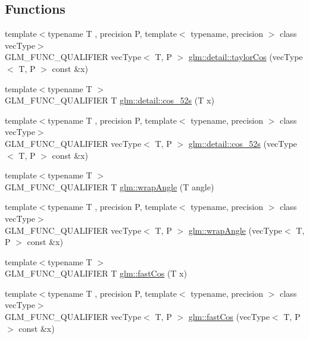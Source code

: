 \subsection*{Functions}
\begin{DoxyCompactItemize}
\item 
{\footnotesize template$<$typename T , precision P, template$<$ typename, precision $>$ class vec\+Type$>$ }\\G\+L\+M\+\_\+\+F\+U\+N\+C\+\_\+\+Q\+U\+A\+L\+I\+F\+I\+E\+R vec\+Type$<$ T, P $>$ \hyperlink{namespaceglm_1_1detail_a4a16281a64def18b20ab307b516095c2}{glm\+::detail\+::taylor\+Cos} (vec\+Type$<$ T, P $>$ const \&x)
\item 
{\footnotesize template$<$typename T $>$ }\\G\+L\+M\+\_\+\+F\+U\+N\+C\+\_\+\+Q\+U\+A\+L\+I\+F\+I\+E\+R T \hyperlink{namespaceglm_1_1detail_a09055f8d723109dc95c8cc2309e20acc}{glm\+::detail\+::cos\+\_\+52s} (T x)
\item 
{\footnotesize template$<$typename T , precision P, template$<$ typename, precision $>$ class vec\+Type$>$ }\\G\+L\+M\+\_\+\+F\+U\+N\+C\+\_\+\+Q\+U\+A\+L\+I\+F\+I\+E\+R vec\+Type$<$ T, P $>$ \hyperlink{namespaceglm_1_1detail_ad0c49f46dc1033d16811b2b90f1dcc64}{glm\+::detail\+::cos\+\_\+52s} (vec\+Type$<$ T, P $>$ const \&x)
\item 
{\footnotesize template$<$typename T $>$ }\\G\+L\+M\+\_\+\+F\+U\+N\+C\+\_\+\+Q\+U\+A\+L\+I\+F\+I\+E\+R T \hyperlink{group__gtx__fast__trigonometry_ga069527c6dbd64f53435b8ebc4878b473}{glm\+::wrap\+Angle} (T angle)
\item 
{\footnotesize template$<$typename T , precision P, template$<$ typename, precision $>$ class vec\+Type$>$ }\\G\+L\+M\+\_\+\+F\+U\+N\+C\+\_\+\+Q\+U\+A\+L\+I\+F\+I\+E\+R vec\+Type$<$ T, P $>$ \hyperlink{namespaceglm_a643ff6d35f2ea3652029cf4197ca900e}{glm\+::wrap\+Angle} (vec\+Type$<$ T, P $>$ const \&x)
\item 
{\footnotesize template$<$typename T $>$ }\\G\+L\+M\+\_\+\+F\+U\+N\+C\+\_\+\+Q\+U\+A\+L\+I\+F\+I\+E\+R T \hyperlink{group__gtx__fast__trigonometry_gab34c8b45c23c0165a64dcecfcc3b302a}{glm\+::fast\+Cos} (T x)
\item 
{\footnotesize template$<$typename T , precision P, template$<$ typename, precision $>$ class vec\+Type$>$ }\\G\+L\+M\+\_\+\+F\+U\+N\+C\+\_\+\+Q\+U\+A\+L\+I\+F\+I\+E\+R vec\+Type$<$ T, P $>$ \hyperlink{namespaceglm_a6a378691e2e5a984d2ad9b256c87961b}{glm\+::fast\+Cos} (vec\+Type$<$ T, P $>$ const \&x)

\end{DoxyCompactItemize}
